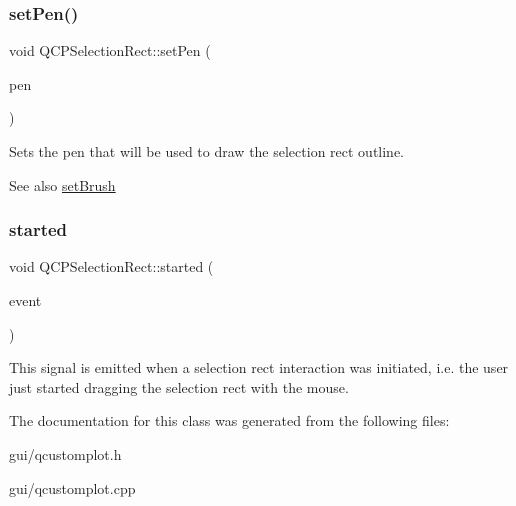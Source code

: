 \subsubsection{\texorpdfstring{set\+Pen()}{setPen()}}
{\footnotesize\ttfamily void Q\+C\+P\+Selection\+Rect\+::set\+Pen (\begin{DoxyParamCaption}\item[{const Q\+Pen \&}]{pen }\end{DoxyParamCaption})}

Sets the pen that will be used to draw the selection rect outline.

\begin{DoxySeeAlso}{See also}
\hyperlink{classQCPSelectionRect_ab0c66f1484418782efa01f4153611080}{set\+Brush} 
\end{DoxySeeAlso}
\mbox{\label{classQCPSelectionRect_a7b7162d19f4f2174d3644ff1a5d335aa}} 
\subsubsection{\texorpdfstring{started}{started}}
{\footnotesize\ttfamily void Q\+C\+P\+Selection\+Rect\+::started (\begin{DoxyParamCaption}\item[{Q\+Mouse\+Event $\ast$}]{event }\end{DoxyParamCaption})\hspace{0.3cm}{\ttfamily [signal]}}

This signal is emitted when a selection rect interaction was initiated, i.\+e. the user just started dragging the selection rect with the mouse. 

The documentation for this class was generated from the following files\+:\begin{DoxyCompactItemize}
\item 
gui/qcustomplot.\+h\item 
gui/qcustomplot.\+cpp\end{DoxyCompactItemize}
